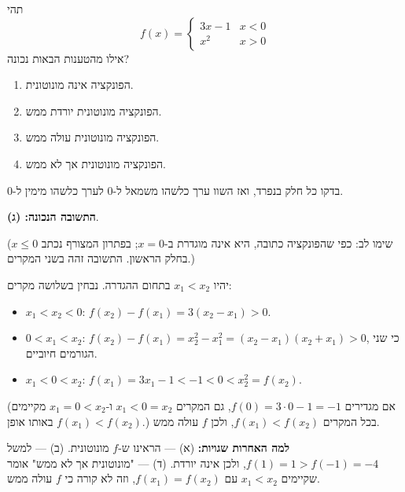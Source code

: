 
\begin{question}
תהי
\[
f(x)=\begin{cases}
3x-1 & x<0\\
x^2 & x>0
\end{cases}
\]
אילו מהטענות הבאות נכונה?
\begin{enumerate}
  \item הפונקציה אינה מונוטונית.
  \item הפונקציה מונוטונית יורדת ממש.
  \item הפונקציה מונוטונית עולה ממש.
  \item הפונקציה מונוטונית אך לא ממש.
\end{enumerate}
\end{question}

\begin{hint}
בדקו כל חלק בנפרד, ואז השוו ערך כלשהו משמאל ל-0 לערך כלשהו מימין ל-0.
\end{hint}

\begin{solution}
\textbf{התשובה הנכונה: (ג)}.

(שימו לב: כפי שהפונקציה כתובה, היא אינה מוגדרת ב-$x=0$; בפתרון המצורף נכתב $x\le0$ בחלק הראשון. התשובה זהה בשני המקרים.)

יהיו $x_1<x_2$ בתחום ההגדרה. נבחין בשלושה מקרים:
\begin{itemize}
  \item $x_1<x_2<0$: $f(x_2)-f(x_1)=3(x_2-x_1)>0$.
  \item $0<x_1<x_2$: $f(x_2)-f(x_1)=x_2^2-x_1^2=(x_2-x_1)(x_2+x_1)>0$, כי שני הגורמים חיוביים.
  \item $x_1<0<x_2$: $f(x_1)=3x_1-1<-1<0<x_2^2=f(x_2)$.
\end{itemize}
(אם מגדירים $f(0)=3\cdot0-1=-1$, גם המקרים $x_1<0=x_2$ ו-$x_1=0<x_2$ מקיימים $f(x_1)<f(x_2)$ באותו אופן.)
בכל המקרים $f(x_1)<f(x_2)$, ולכן $f$ עולה ממש.

\textbf{למה האחרות שגויות:} (א) — הראינו ש-$f$ מונוטונית. (ב) — למשל $f(1)=1>f(-1)=-4$, ולכן אינה יורדת. (ד) — "מונוטונית אך לא ממש" אומר שקיימים $x_1<x_2$ עם $f(x_1)=f(x_2)$, וזה לא קורה כי $f$ עולה ממש.
\end{solution}
